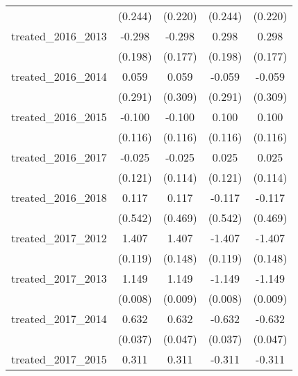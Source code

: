 {\begin{tabular}{l*{4}{c}}
            &     (0.244)         &     (0.220)         &     (0.244)         &     (0.220)         \\
[1em]
treated\_2016\_2013&      -0.298         &      -0.298         &       0.298         &       0.298         \\
            &     (0.198)         &     (0.177)         &     (0.198)         &     (0.177)         \\
[1em]
treated\_2016\_2014&       0.059         &       0.059         &      -0.059         &      -0.059         \\
            &     (0.291)         &     (0.309)         &     (0.291)         &     (0.309)         \\
[1em]
treated\_2016\_2015&      -0.100         &      -0.100         &       0.100         &       0.100         \\
            &     (0.116)         &     (0.116)         &     (0.116)         &     (0.116)         \\
[1em]
treated\_2016\_2017&      -0.025         &      -0.025         &       0.025         &       0.025         \\
            &     (0.121)         &     (0.114)         &     (0.121)         &     (0.114)         \\
[1em]
treated\_2016\_2018&       0.117         &       0.117         &      -0.117         &      -0.117         \\
            &     (0.542)         &     (0.469)         &     (0.542)         &     (0.469)         \\
[1em]
treated\_2017\_2012&       1.407\sym{***}&       1.407\sym{***}&      -1.407\sym{***}&      -1.407\sym{***}\\
            &     (0.119)         &     (0.148)         &     (0.119)         &     (0.148)         \\
[1em]
treated\_2017\_2013&       1.149\sym{***}&       1.149\sym{***}&      -1.149\sym{***}&      -1.149\sym{***}\\
            &     (0.008)         &     (0.009)         &     (0.008)         &     (0.009)         \\
[1em]
treated\_2017\_2014&       0.632\sym{***}&       0.632\sym{***}&      -0.632\sym{***}&      -0.632\sym{***}\\
            &     (0.037)         &     (0.047)         &     (0.037)         &     (0.047)         \\
[1em]
treated\_2017\_2015&       0.311\sym{**} &       0.311\sym{***}&      -0.311\sym{**} &      -0.311\sym{***}\\

\end{tabular}}

